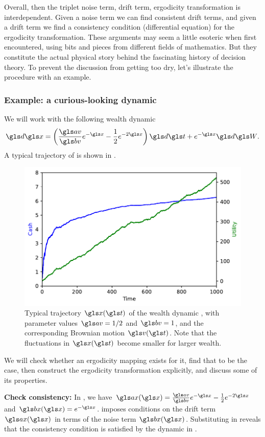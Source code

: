 Overall, then the triplet noise term, drift term, ergodicity transformation is
interdependent. Given a noise term we can find consistent drift terms,
and given a drift term we find a consistency condition (differential
equation) for the ergodicity transformation. These arguments may seem a little
esoteric when first encountered, using bits and pieces from different 
fields of mathematics. But they constitute the actual physical story behind the
fascinating history of decision theory. To prevent the discussion from getting too 
dry, let's illustrate the procedure with an example.

\subsubsection{Example: a curious-looking dynamic}

We will work with the following wealth dynamic
\begin{equation}
\gd\x=\left(\frac{\av}{\bv}e^{-\x}-\frac{1}{2}e^{-2\x}\right)\gd\t+e^{-\x}\gd\gW.
\elabel{test_dyn}
\end{equation}
A typical trajectory of  is shown in .

\begin{figure}
\centering
\includegraphics[width=.5\textwidth]{./chapter_riskless/figs/trajectories.pdf}
\caption{\small Typical trajectory $\x(\t)$ of the wealth
dynamic , with parameter values $\av=1/2$ and $\bv=1$,  and the corresponding Brownian motion $\gv(\t)$. Note that the fluctuations in $\x(\t)$ become smaller for larger wealth. }
\end{figure}

We will check whether an ergodicity 
mapping exists for it, find that to be the case, then construct the 
ergodicity transformation explicitly, and discuss some of its properties.

{\bf Check consistency:}
In , we have $\ax(\x)=\frac{\av}{\bv}e^{-\x}-\frac{1}{2}e^{-2\x}$ and $\bx(\x)=e^{-\x}$.
 imposes conditions on the drift term $\ax(\x)$ in terms of the 
noise term $\bx(\x)$. Substituting in  reveals that the consistency 
condition is satisfied by the dynamic in .

